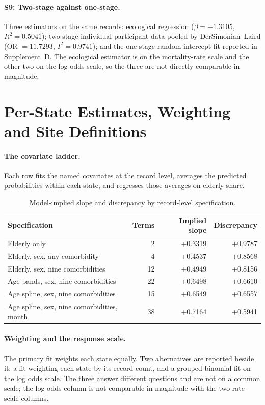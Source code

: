 \documentclass[11pt]{article}
\begin{document}
\paragraph{S9: Two-stage against one-stage.}
Three estimators on the same records: ecological regression
($\beta = +1.3105$,
$R^2 = 0.5041$); two-stage individual participant
data pooled by DerSimonian--Laird
(OR $= 11.7293$,
$I^2 = 0.9741$); and the one-stage random-intercept
fit reported in Supplement~D.  The ecological estimator is on the
mortality-rate scale and the other two on the log odds scale, so the three are
not directly comparable in magnitude.

\section{Per-State Estimates, Weighting and Site Definitions}
\label{supp:perstate}

\paragraph{The covariate ladder.}
Each row fits the named covariates at the record level, averages the predicted
probabilities within each state, and regresses those averages on elderly share.

\begin{table}[h]
\centering
\caption{Model-implied slope and discrepancy by record-level specification.}
\vspace{0.5\baselineskip}
\begin{tabular}{lrrr}
\toprule
Specification & Terms & Implied slope & Discrepancy \\
\midrule
Elderly only & 2 & +0.3319 & +0.9787 \\
Elderly, sex, any comorbidity & 4 & +0.4537 & +0.8568 \\
Elderly, sex, nine comorbidities & 12 & +0.4949 & +0.8156 \\
Age bands, sex, nine comorbidities & 22 & +0.6498 & +0.6610 \\
Age spline, sex, nine comorbidities & 15 & +0.6549 & +0.6557 \\
Age spline, sex, nine comorbidities, month & 38 & +0.7164 & +0.5941 \\
\bottomrule
\end{tabular}
\end{table}

\paragraph{Weighting and the response scale.}
The primary fit weights each state equally.  Two alternatives are reported
beside it: a fit weighting each state by its record count, and a
grouped-binomial fit on the log odds scale.  The three answer different
questions and are not on a common scale; the log odds column is not comparable
in magnitude with the two rate-scale columns.
\end{document}
